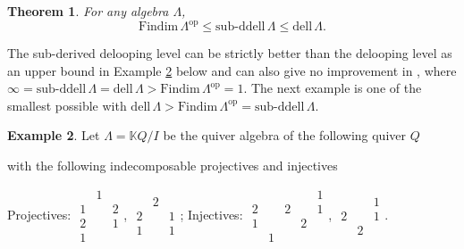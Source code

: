 \documentclass{conm-p-l}
\newcommand{\Findim}{\mathrm{Findim}\,}
\newcommand{\dell}{\mathrm{dell}\,}
\renewcommand{\dell}{\mathrm{dell}\,}
\newcommand{\op}{\mathrm{op}}
\renewcommand{\k}{\mathbb{K}}
\newcommand{\subddell}{\mathrm{sub}\text{-}\mathrm{ddell}\,}
\newtheorem{theorem}{Theorem}[section]
\theoremstyle{definition}
\newtheorem{example}[theorem]{Example}
\theoremstyle{remark}
\numberwithin{equation}{section}
\begin{document}
\begin{theorem}
For any algebra $\Lambda$,
\label{thm:subddell}
\[
\Findim\Lambda^{\op} \leq \subddell\Lambda \leq \dell\Lambda.
\]
\end{theorem}

The sub-derived delooping level can be strictly better than the delooping level as an upper bound in Example \ref{ex:subddell} below and can also give no improvement in \cite[Example 3.8]{guo2025derived}, where $\infty=\subddell\Lambda=\dell\Lambda > \Findim\Lambda^{\op} = 1$. The next example is one of the smallest possible with $\dell\Lambda>\Findim\Lambda^{\op}=\subddell\Lambda$.

\begin{example}
\label{ex:subddell}
Let $\Lambda=\k Q/I$ be the quiver algebra of the following quiver $Q$

\begin{center}
\end{center}
with the following indecomposable projectives and injectives
\begingroup
\setlength\arraycolsep{1pt}
\begin{center}
Projectives: $\begin{matrix}
{} & 1 & {} \\
1 & {} & 2 \\
2 & {} & 1 \\
1 & {} & {}
\end{matrix}$, \quad
$\begin{matrix}
{} & 2 & {} \\
2 & {} & 1 \\
1 & {} & 1
\end{matrix}$;
\qquad
Injectives: $\begin{matrix}
{} & {} & {} & {} & 1 \\
2 & {} & 2 & {} & 1 \\
1 & {} & {} & 2 & {} \\
{} & 1 & {} & {} & {}
\end{matrix}$, \quad
$\begin{matrix}
{} & {} & 1 \\
2 & {} & 1 \\
{} & 2 & {}
\end{matrix}$.
\end{center}


\end{example}
\end{document}
